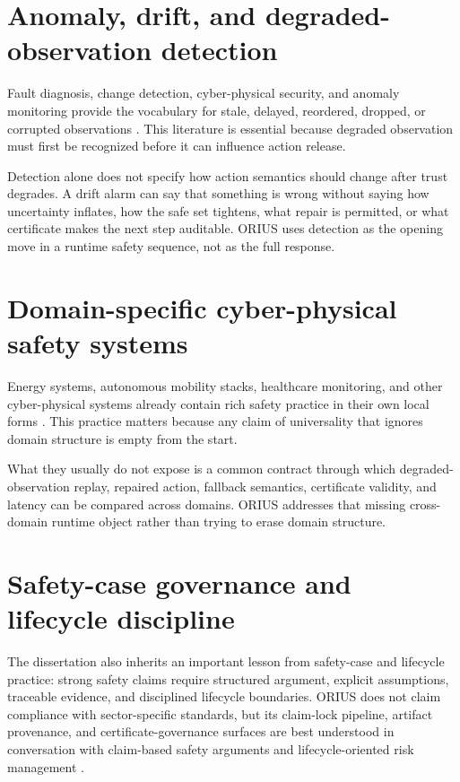 \section{Anomaly, drift, and degraded-observation detection}
Fault diagnosis, change detection, cyber-physical security, and anomaly monitoring provide
the vocabulary for stale, delayed, reordered, dropped, or corrupted observations
\cite{rajkumar2010cps,derler2012modeling,baheti2011cyberphysical,pasqualetti2013attack,teixeira2015secure,basseville1993detection,page1954continuous,page1955test,hinkley1971inference,liu2008isolation,breunig2000lof}.
This literature is essential because degraded observation must first be recognized before it
can influence action release.

Detection alone does not specify how action semantics should change after trust degrades. A
drift alarm can say that something is wrong without saying how uncertainty inflates, how the
safe set tightens, what repair is permitted, or what certificate makes the next step
auditable. ORIUS uses detection as the opening move in a runtime safety sequence, not as
the full response.

\section{Domain-specific cyber-physical safety systems}
Energy systems, autonomous mobility stacks, healthcare monitoring, and other
cyber-physical systems already contain rich safety practice in their own local forms
\cite{rajkumar2010cps,baheti2011cyberphysical,pasqualetti2013attack,teixeira2015secure,sha2001using,ames2019control}.
This practice matters because any claim of universality that ignores domain structure is
empty from the start.

What they usually do not expose is a common contract through which degraded-observation
replay, repaired action, fallback semantics, certificate validity, and latency can be
compared across domains. ORIUS addresses that missing cross-domain runtime object rather
than trying to erase domain structure.

\section{Safety-case governance and lifecycle discipline}
The dissertation also inherits an important lesson from safety-case and lifecycle practice:
strong safety claims require structured argument, explicit assumptions, traceable evidence,
and disciplined lifecycle boundaries. ORIUS does not claim compliance with sector-specific
standards, but its claim-lock pipeline, artifact provenance, and certificate-governance
surfaces are best understood in conversation with claim-based safety arguments and
lifecycle-oriented risk management
\cite{ul4600_2023,nist2023ai_rmf,iso26262_2018,iec61508_2010}.

